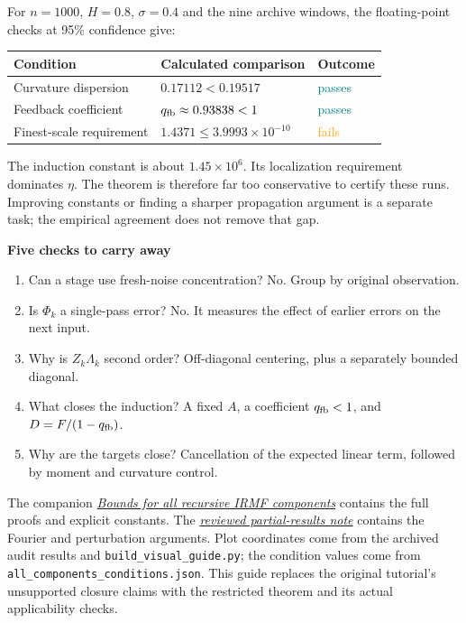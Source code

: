 \documentclass[11pt]{article}
\newcommand{\sub}[1]{\par\vspace{3pt}{\sffamily\bfseries\large #1}\par}
\begin{document}
\sub{Apply the new sufficient conditions to the Gaussian design}
For $n=1000$, $H=0.8$, $\sigma=0.4$ and the nine archive windows,
the floating-point checks at 95\% confidence give:
\begin{center}
\renewcommand{\arraystretch}{1.22}
\begin{tabular}{@{}p{60mm}p{61mm}l@{}}
\toprule
Condition & Calculated comparison & Outcome\\
\midrule
Curvature dispersion & $0.17112<0.19517$ & \textcolor{teal}{passes}\\
Feedback coefficient & $q_{\rm fb}\approx0.93838<1$ & \textcolor{teal}{passes}\\
Finest-scale requirement & $1.4371\le3.9993\times10^{-10}$ & \textcolor{orange}{fails}\\
\bottomrule
\end{tabular}
\end{center}
The induction constant is about $1.45\times10^6$. Its localization
requirement dominates $\eta$. The theorem is therefore far too conservative
to certify these runs. Improving constants or finding a sharper propagation
argument is a separate task; the empirical agreement does not remove that gap.

\begin{idea}
\textbf{Five checks to carry away}
\begin{enumerate}
\item Can a stage use fresh-noise concentration? No. Group by original observation.
\item Is $\Phi_k$ a single-pass error? No. It measures the effect of earlier errors on the next input.
\item Why is $Z_k\Lambda_k$ second order? Off-diagonal centering, plus a separately bounded diagonal.
\item What closes the induction? A fixed $A$, a coefficient $q_{\rm fb}<1$, and $D=F/(1-q_{\rm fb})$.
\item Why are the targets close? Cancellation of the expected linear term, followed by moment and curvature control.
\end{enumerate}
\end{idea}

\sub{Where to find the full derivations}
\small
The companion \href{../irmf_all_components_bound.pdf}{\textit{Bounds for all recursive IRMF components}}
contains the full proofs and explicit constants. The
\href{../irmf_recursive_component_bounds.pdf}{\textit{reviewed partial-results note}}
contains the Fourier and perturbation arguments.
Plot coordinates come from the archived audit results and
\texttt{build\_visual\_guide.py}; the condition values come from
\texttt{all\_components\_conditions.json}.
This guide replaces the original tutorial's unsupported closure claims
with the restricted theorem and its actual applicability checks.
\end{document}
